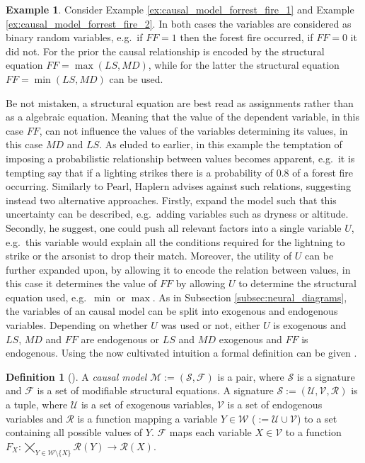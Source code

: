 \documentclass[11pt,a4paper]{book}
\theoremstyle{definition}
\newtheorem{definition}{Definition}[section]
\theoremstyle{definition}
\newtheorem{example}{Example}[section]
\theoremstyle{definition}
\theoremstyle{remark}
\newcommand{\cmodel}{\mathcal{M}}
\newcommand{\csig}{\mathcal{S}}
\newcommand{\cfoos}{\mathcal{F}}
\newcommand{\crange}{\mathcal{R}}
\newcommand{\cvars}{\mathcal{W}}
\newcommand{\cenvars}{\mathcal{V}}
\newcommand{\cexvars}{\mathcal{U}}
\begin{document}
\begin{example}
\label{ex:causal_model_forrest_fire}
Consider Example \ref{ex:causal_model_forrest_fire_1}  and Example \ref{ex:causal_model_forrest_fire_2}.
In both cases the variables are considered as binary random variables, e.g.\ if $\mathit{FF} = 1$ then the forest fire occurred, if $\mathit{FF} = 0$ it did not.
For the prior the causal relationship is encoded by the structural equation $\mathit{FF} = \max(\mathit{LS}, \mathit{MD})$, while for the latter the structural equation $\mathit{FF} = \min(\mathit{LS}, \mathit{MD})$
can be used.
\end{example}

Be not mistaken, a structural equation are best read as assignments rather than as a algebraic equation. Meaning that the value of the dependent variable, in this case $\mathit{FF}$, can not influence the values of the variables determining its values, in this case $\mathit{MD}$ and $\mathit{LS}$. As eluded to earlier, in this example the temptation of imposing a probabilistic relationship between values becomes apparent, e.g.\ it is tempting say that if a lighting strikes there is a probability of $0.8$ of a forest fire occurring. Similarly to Pearl, Haplern advises against such relations, suggesting instead two alternative approaches. Firstly, expand the model such that this uncertainty can be described, e.g.\ adding variables such as dryness or altitude. Secondly, he suggest, one could push all relevant factors into a single variable $U$, e.g.\ this variable would explain all the conditions required for the lightning to strike or the arsonist to drop their match.  Moreover, the utility of $U$ can be further expanded upon, by allowing it to encode the relation between values, in this case it determines the value of $\mathit{FF}$ by allowing $U$ to determine the structural equation used, e.g.\ $\min$ or $\max$. As in Subsection \ref{subsec:neural_diagrams}, the variables of an causal model can be split into exogenous and endogenous variables. Depending on whether $U$ was used or not, either $U$ is exogenous and $\mathit{LS}$, $\mathit{MD}$ and $\mathit{FF}$ are endogenous or $\mathit{LS}$  and $\mathit{MD}$ exogenous and $\mathit{FF}$ is endogenous. Using the now cultivated intuition a formal definition can be given \cite{halpern2015cause}.
 

\begin{definition}[\cite{halpern2015cause}]
A \emph{causal model} $\cmodel:=(\csig, \cfoos)$ is a pair, where $\csig$ is a signature and $\cfoos$ is a set of modifiable structural equations.
A signature $\csig:=(\cexvars, \cenvars, \crange)$ is a tuple, where $\cexvars$ is a set of exogenous variables, $\cenvars$ is a set of endogenous variables and $\crange$ is a function mapping 
a variable $Y \in \cvars$ ($:=\cexvars \cup \cenvars$) to a set containing all possible values of $Y$. 
$\cfoos$ maps each variable $X\in \cenvars$ to a function $F_X:  \bigtimes_{Y \in \cvars\setminus \{X\}} \crange(Y) \to \crange(X)$.
\end{definition}
\end{document}
